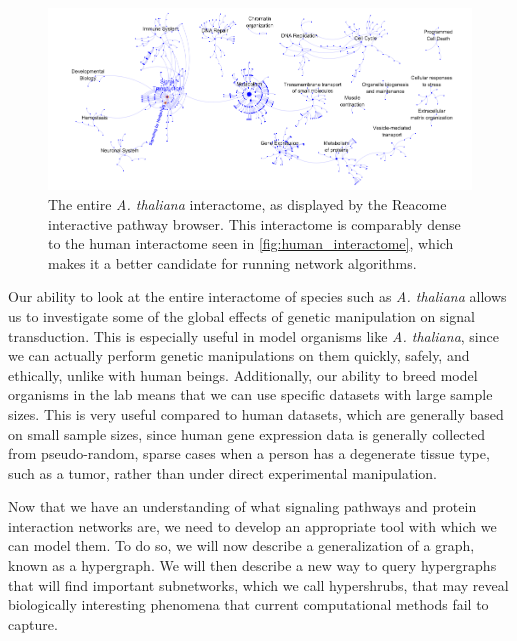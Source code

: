 \documentclass[12pt,twoside]{reedthesis}
\theoremstyle{definition}
\begin{document}
\begin{figure}[h]
  \begin{center}
    \includegraphics[width=\textwidth]{at_interactome}
  \caption[\textit{Arabidopsis thaliana} interactome]{The entire \textit{A. thaliana}  interactome, as displayed by the Reacome interactive pathway browser. This interactome is comparably dense to the human interactome seen in \ref{fig:human_interactome}, which makes it a better candidate for running network algorithms.}
  \label{fig:at_interactome}
  \end{center}
\end{figure}

Our ability to look at the entire interactome of species such as \textit{A. thaliana} allows us to investigate some of the global effects of genetic manipulation on signal transduction. This is especially useful in model organisms like \textit{A. thaliana}, since we can actually perform genetic manipulations on them quickly, safely, and ethically, unlike with human beings. Additionally, our ability to breed model organisms in the lab means that we can use specific datasets with large sample sizes. This is very useful compared to human datasets, which are generally based on small sample sizes, since human gene expression data is generally collected from pseudo-random, sparse cases when a person has a degenerate tissue type, such as a tumor, rather than under direct experimental manipulation.\par

Now that we have an understanding of what signaling pathways and protein interaction networks are, we need to develop an appropriate tool with which we can model them. To do so, we will now describe a generalization of a graph, known as a hypergraph. We will then describe a new way to query hypergraphs that will find important subnetworks, which we call hypershrubs, that may reveal biologically interesting phenomena that current computational methods fail to capture.\par
\end{document}
